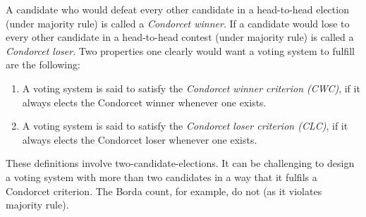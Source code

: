 A candidate who would defeat every other candidate in a head-to-head election (under majority rule) is called a {\emph{Condorcet winner}}. If a candidate would lose to every other candidate in a head-to-head contest (under majority rule) is called a {\emph{Condorcet loser}}. Two properties one clearly would want a voting system to fulfill are the following: 
\begin{enumerate}
\item A voting system is said to satisfy the {\emph{Condorcet winner criterion (CWC)}}, if it always elects the Condorcet winner whenever one exists.
\item A voting system is said to satisfy the {\emph{Condorcet loser criterion (CLC)}}, if it always elects the Condorcet loser whenever one exists. 
\end{enumerate}
These definitions involve two-candidate-elections. It can be challenging to design a voting system with more than two candidates in a way that it fulfils a Condorcet criterion. The Borda count, for example, do not (as it violates majority rule). \\
